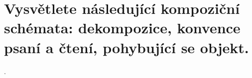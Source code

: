 \section{Vysvětlete následující kompoziční schémata: dekompozice, konvence psaní a čtení, pohybující se objekt.}.
